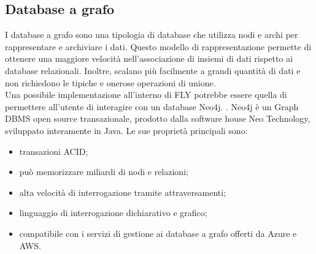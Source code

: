 \subsection{Database a grafo}
I database a grafo sono una tipologia di database che utilizza nodi e archi per rappresentare e archiviare i dati. Questo modello di rappresentazione permette di ottenere una maggiore velocità nell'associazione di insiemi di dati rispetto ai database relazionali. Inoltre, scalano più facilmente a grandi quantità di dati e non richiedono le tipiche e onerose operazioni di unione. \\
Una possibile implementazione all'interno di FLY potrebbe essere quella di permettere all'utente di interagire con un database Neo4j. \cite{neo4j}. Neo4j è un Graph DBMS open source transazionale, prodotto dalla software house Neo Technology, sviluppato interamente in Java. Le sue proprietà principali sono:
\begin{itemize}
    \item transazioni ACID;
    \item può memorizzare miliardi di nodi e relazioni;
    \item alta velocità di interrogazione tramite attraversamenti;
    \item linguaggio di interrogazione dichiarativo e grafico;
    \item compatibile con i servizi di gestione ai database a grafo offerti da Azure e AWS.
\end{itemize}